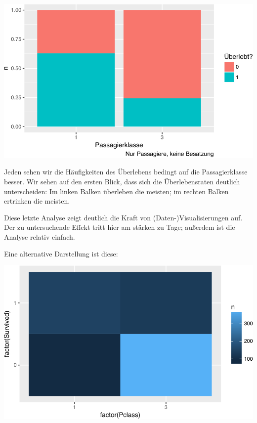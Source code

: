 \documentclass[12pt,]{book}
\newenvironment{Shaded}{\begin{snugshade}}{\end{snugshade}}
\newcommand{\KeywordTok}[1]{\textcolor[rgb]{0.13,0.29,0.53}{\textbf{{#1}}}}
\newcommand{\DataTypeTok}[1]{\textcolor[rgb]{0.13,0.29,0.53}{{#1}}}
\newcommand{\StringTok}[1]{\textcolor[rgb]{0.31,0.60,0.02}{{#1}}}
\newcommand{\NormalTok}[1]{{#1}}
\begin{document}
\begin{center}\includegraphics[width=0.7\linewidth]{075_Fallstudie_Titanic_files/figure-latex/unnamed-chunk-13-1} \end{center}

Jeden sehen wir die Häufigkeiten des Überlebens bedingt auf die
Passagierklasse besser. Wir sehen auf den ersten Blick, dass sich die
Überlebensraten deutlich unterscheiden: Im linken Balken überleben die
meisten; im rechten Balken ertrinken die meisten.

Diese letzte Analyse zeigt deutlich die Kraft von
(Daten-)Visualisierungen auf. Der zu untersuchende Effekt tritt hier am
stärken zu Tage; außerdem ist die Analyse relativ einfach.

Eine alternative Darstellung ist diese:

\begin{Shaded}
\end{Shaded}

\begin{center}\includegraphics[width=0.7\linewidth]{075_Fallstudie_Titanic_files/figure-latex/unnamed-chunk-14-1} \end{center}
\end{document}
